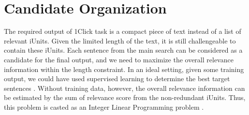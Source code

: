 \section{Candidate Organization}

The required output of 1Click task is a compact piece of text instead
of a list of relevant iUnits.  Given the limited length of the text,
it is still challengeable to contain these iUnits.  Each sentence from
the main search can be considered as a candidate for the final output,
and we need to maximize the overall relevance information within the
length constraint.  In an ideal setting, given some training output,
we could have used supervised learning to determine the best target
sentences \cite{Gondek_al:12}. Without training data, however, the
overall relevance information can be estimated by the sum of relevance
score from the non-redundant iUnits.  Thus, this problem is casted as
an Integer Linear Programming problem \cite{McDonald_ECIR07}.



